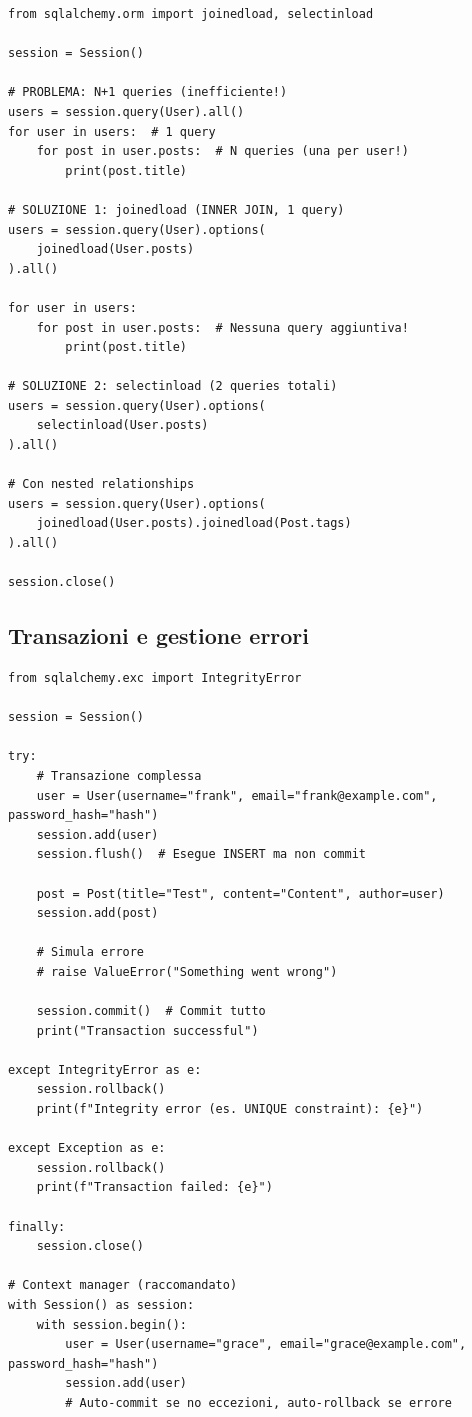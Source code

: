 \begin{lstlisting}
from sqlalchemy.orm import joinedload, selectinload

session = Session()

# PROBLEMA: N+1 queries (inefficiente!)
users = session.query(User).all()
for user in users:  # 1 query
    for post in user.posts:  # N queries (una per user!)
        print(post.title)

# SOLUZIONE 1: joinedload (INNER JOIN, 1 query)
users = session.query(User).options(
    joinedload(User.posts)
).all()

for user in users:
    for post in user.posts:  # Nessuna query aggiuntiva!
        print(post.title)

# SOLUZIONE 2: selectinload (2 queries totali)
users = session.query(User).options(
    selectinload(User.posts)
).all()

# Con nested relationships
users = session.query(User).options(
    joinedload(User.posts).joinedload(Post.tags)
).all()

session.close()
\end{lstlisting}

\subsection{Transazioni e gestione errori}

\begin{lstlisting}
from sqlalchemy.exc import IntegrityError

session = Session()

try:
    # Transazione complessa
    user = User(username="frank", email="frank@example.com", password_hash="hash")
    session.add(user)
    session.flush()  # Esegue INSERT ma non commit

    post = Post(title="Test", content="Content", author=user)
    session.add(post)

    # Simula errore
    # raise ValueError("Something went wrong")

    session.commit()  # Commit tutto
    print("Transaction successful")

except IntegrityError as e:
    session.rollback()
    print(f"Integrity error (es. UNIQUE constraint): {e}")

except Exception as e:
    session.rollback()
    print(f"Transaction failed: {e}")

finally:
    session.close()

# Context manager (raccomandato)
with Session() as session:
    with session.begin():
        user = User(username="grace", email="grace@example.com", password_hash="hash")
        session.add(user)
        # Auto-commit se no eccezioni, auto-rollback se errore
\end{lstlisting}

